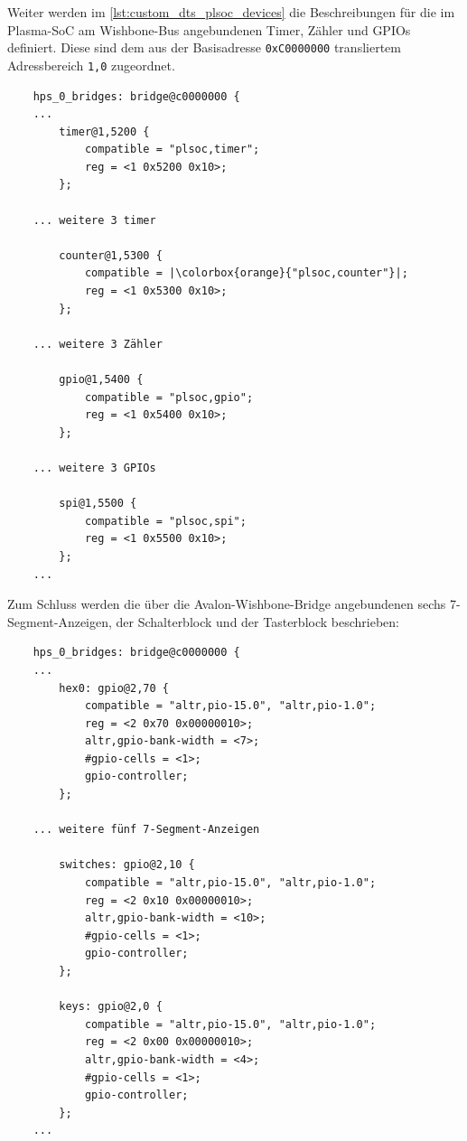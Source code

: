 Weiter werden im \cref{lst:custom_dts_plsoc_devices} die Beschreibungen für die im Plasma-SoC am Wishbone-Bus angebundenen Timer, Zähler und \glspl{GPIO} definiert.
Diese sind dem aus der Basisadresse \texttt{0xC0000000} transliertem Adressbereich \texttt{1,0} zugeordnet.
\begin{code}
	\begin{verbatim}
	hps_0_bridges: bridge@c0000000 {		 
	...
		timer@1,5200 {
			compatible = "plsoc,timer";
			reg = <1 0x5200 0x10>;
		};
		
	... weitere 3 timer
		
		counter@1,5300 {
			compatible = |\colorbox{orange}{"plsoc,counter"}|;
			reg = <1 0x5300 0x10>;
		};
		
	... weitere 3 Zähler
		
		gpio@1,5400 {
			compatible = "plsoc,gpio";
			reg = <1 0x5400 0x10>;
		};
		
	... weitere 3 GPIOs
		
		spi@1,5500 {
			compatible = "plsoc,spi";
			reg = <1 0x5500 0x10>;
		};
	...
	\end{verbatim}
	
	\caption{Devicetree: Komponenten im Plasma-SoC}
	\label{lst:custom_dts_plsoc_devices}
\end{code}

Zum Schluss werden die über die Avalon-Wishbone-Bridge angebundenen sechs 7-Segment-Anzeigen, der Schalterblock und der Tasterblock beschrieben:
\begin{code}
	\begin{verbatim}
	hps_0_bridges: bridge@c0000000 {		 
	...
		hex0: gpio@2,70 {
			compatible = "altr,pio-15.0", "altr,pio-1.0";
			reg = <2 0x70 0x00000010>;
			altr,gpio-bank-width = <7>;		
			#gpio-cells = <1>;
			gpio-controller;			
		};
	
	... weitere fünf 7-Segment-Anzeigen
	
		switches: gpio@2,10 {
			compatible = "altr,pio-15.0", "altr,pio-1.0";
			reg = <2 0x10 0x00000010>;							
			altr,gpio-bank-width = <10>;
			#gpio-cells = <1>;
			gpio-controller;			
		};
		
		keys: gpio@2,0 {
			compatible = "altr,pio-15.0", "altr,pio-1.0";
			reg = <2 0x00 0x00000010>;
			altr,gpio-bank-width = <4>;	
			#gpio-cells = <1>;						
			gpio-controller;				
		};
	...
	\end{verbatim}
	
	\caption{Devicetree: Komponenten am Avalon-Bus}
	\label{lst:custom_dts_avalon_periph}
\end{code}

